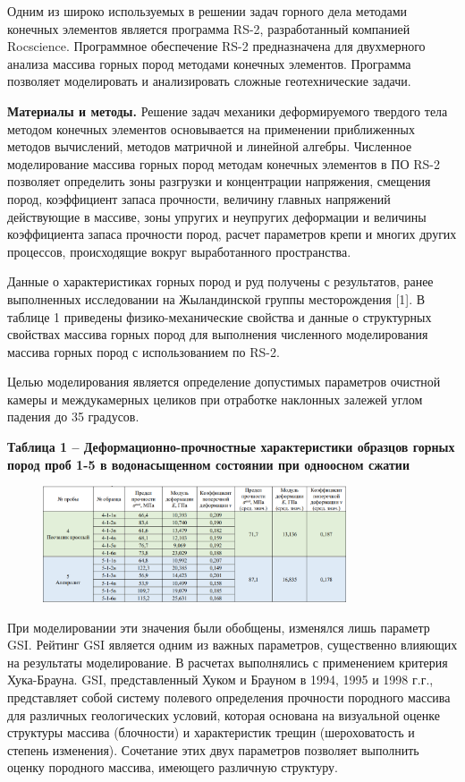 Одним из широко используемых в решении задач горного дела методами
конечных элементов является программа RS-2, разработанный компанией
Rocscience. Программное обеспечение RS-2 предназначена для двухмерного
анализа массива горных пород методами конечных элементов. Программа
позволяет моделировать и анализировать сложные геотехнические задачи.

{\bfseries Материалы и методы.} Решение задач механики деформируемого
твердого тела методом конечных элементов основывается на применении
приближенных методов вычислений, методов матричной и линейной алгебры.
Численное моделирование массива горных пород методам конечных элементов
в ПО RS-2 позволяет определить зоны разгрузки и концентрации напряжения,
смещения пород, коэффициент запаса прочности, величину главных
напряжений действующие в массиве, зоны упругих и неупругих деформации и
величины коэффициента запаса прочности пород, расчет параметров крепи и
многих других процессов, происходящие вокруг выработанного пространства.

Данные о характеристиках горных пород и руд получены с результатов,
ранее выполненных исследовании на Жыландинской группы месторождения
{[}1{]}. В таблице 1 приведены физико-механические свойства и данные о
структурных свойствах массива горных пород для выполнения численного
моделирования массива горных пород с использованием по RS-2.

Целью моделирования является определение допустимых параметров очистной
камеры и междукамерных целиков при отработке наклонных залежей углом
падения до 35 градусов.

{\bfseries Таблица 1 -- Деформационно-прочностные характеристики образцов
горных пород проб 1-5 в водонасыщенном состоянии при одноосном сжатии}

\begin{figure}[H]
	\centering
	\includegraphics[width=0.8\textwidth]{assets/281}
	\caption*{}
\end{figure}

При моделировании эти значения были обобщены, изменялся лишь параметр
GSI. Рейтинг GSI является одним из важных параметров, существенно
влияющих на результаты моделирование. В расчетах выполнялись с
применением критерия Хука-Брауна. GSI, представленный Хуком и Брауном в
1994, 1995 и 1998 г.г., представляет собой систему полевого определения
прочности породного массива для различных геологических условий, которая
основана на визуальной оценке структуры массива (блочности) и
характеристик трещин (шероховатость и степень изменения). Сочетание этих
двух параметров позволяет выполнить оценку породного массива, имеющего
различную структуру.

